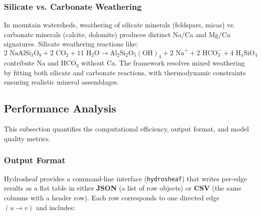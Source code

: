 \documentclass[12pt,a4paper]{article}
\theoremstyle{plain}
\theoremstyle{definition}
\theoremstyle{remark}
\begin{document}
\subsubsection{Silicate vs. Carbonate Weathering}

In mountain watersheds, weathering of silicate minerals (feldspars, micas) vs. carbonate minerals (calcite, dolomite) produces distinct Na/Ca and Mg/Ca signatures. Silicate weathering reactions like:
\begin{equation}
	\text{2 NaAlSi}_3\text{O}_8 + \text{2 CO}_2 + \text{11 H}_2\text{O} \to \text{Al}_2\text{Si}_2\text{O}_5(\text{OH})_4 + \text{2 Na}^+ + \text{2 HCO}_3^- + \text{4 H}_4\text{SiO}_4
\end{equation}
contribute Na and HCO$_3$ without Ca. The framework resolves mixed weathering by fitting both silicate and carbonate reactions, with thermodynamic constraints ensuring realistic mineral assemblages.

\subsection{Performance Analysis}

This subsection quantifies the computational efficiency, output format, and model quality metrics.

\subsubsection{Output Format}

Hydrosheaf provides a command-line interface (\texttt{hydrosheaf}) that writes per-edge results as a flat table in either \textbf{JSON} (a list of row objects) or \textbf{CSV} (the same columns with a header row). Each row corresponds to one directed edge $(u \to v)$ and includes:
\end{document}
